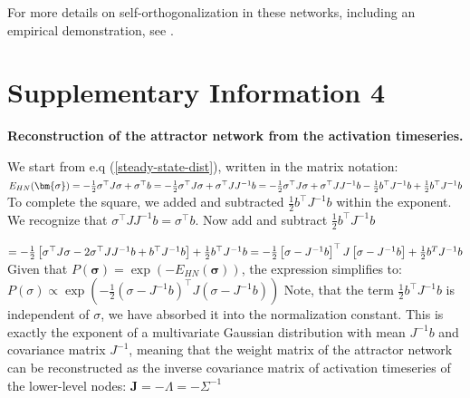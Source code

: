 \documentclass{article}
\begin{document}
For more details on self-orthogonalization in these networks, including an empirical demonstration, see \citep{https://doi.org/10.48550/arxiv.2505.22749}.

\section{Supplementary Information 4}

\textbf{Reconstruction of the attractor network from the activation timeseries.}

We start from e.q (\ref{steady-state-dist}), written in the matrix notation: \newline
$E_{HN}(\bm{\sigma}) = -\frac{1}{2} \sigma^\top J \sigma + \sigma^\top b \\ 
= -\frac{1}{2} \sigma^\top J \sigma + \sigma^\top J J^{ -1} b \\
= -\frac{1}{2} \sigma^\top J \sigma + \sigma^\top J J^{ -1} b - \frac{1}{2} b^\top J^{ -1} b + \frac{1}{2} b^\top J^{ -1} b$ \newline
\newline
To complete the square, we added and subtracted  $\frac{1}{2} b^\top J^{ -1} b$  within the exponent.
We recognize that  $\sigma^\top J J^{ -1} b = \sigma^\top b$. Now add and subtract  $\frac{1}{2} b^\top J^{ -1} b$

$= -\frac{1}{2} \left[\sigma^\top J \sigma - 2 \sigma^\top J J^{ -1} b + b^\top J^{ -1} b \right] + \frac{1}{2} b^\top J^{ -1} b \\
= -\frac{1}{2} \left[\sigma - J^{ -1} b \right]^\top J \left[\sigma - J^{ -1} b\right] + \frac{1}{2} b^T J^{ -1} b$ \newline
\newline
Given that $P(\bm{\sigma}) = \exp( -E_{HN}(\bm{\sigma}))$, the expression simplifies to:
$P(\sigma) \propto \exp\left( -\frac{1}{2} (\sigma - J^{ -1} b)^\top J (\sigma - J^{ -1} b) \right)$ \newline
\newline
Note, that the term  $\frac{1}{2} b^\top J^{ -1} b$  is independent of  $\sigma$, we have absorbed it into the normalization constant.
\newline
This is exactly the exponent of a multivariate Gaussian distribution with mean $J^{ -1} b$ and covariance matrix $J^{ -1}$, meaning that the weight matrix of the attractor network can be reconstructed as the inverse covariance matrix of activation timeseries of the lower-level nodes:
$\mathbf{J} = -\Lambda = -\Sigma^{ -1}$





\end{document}
